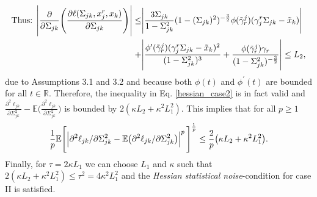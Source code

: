\begin{condition}
\begin{multline}
\begin{aligned}
            \end{aligned}
    \end{multline} 
    \begin{equation*}
        \begin{split}
            \text{Thus: } \abs{\frac{\partial}{\partial \Sigma_{jk}} \Bigg(\frac{\partial\ell(\Sigma_{jk}, x_j^r,x_k)}{\partial \Sigma_{jk}}\Bigg)} \leq &\abs{\frac{3\Sigma_{jk}}{1-\Sigma_{jk}^2} (1-(\Sigma_{jk})^2)^{-\frac{3}{2}} \phi({\tilde{\gamma}}^j_{r})({\gamma}_j^r\Sigma_{jk} - {\tilde{x}}_{k})} \\
            + &\abs{\frac{\phi^\prime({\tilde{\gamma}}^j_{r})({\gamma}_j^r\Sigma_{jk} - {\tilde{x}}_{k})^2}{(1-\Sigma_{jk}^2)^3} + \frac{\phi({\tilde{\gamma}}^j_{r}){\gamma}_{r}}{(1-\Sigma_{jk}^2)^{-\frac{3}{2}}}} \leq L_2,
        \end{split} 
    \end{equation*}
    due to Assumptions 3.1 and 3.2 %
    and because both $\phi(t)$ and $\phi^{\prime}(t)$ are bounded for all $t\in\mathbb{R}$. Therefore, the inequality in Eq. \eqref{hessian_case2} is in fact valid and $\frac{\partial^2\ell_{jk}}{\partial \Sigma_{jk}^{2}} - \mathbb{E}\bigg(\frac{\partial^2\ell_{jk}}{\partial \Sigma_{jk}^{2}}\bigg)$ is bounded by $2(\kappa L_2 + \kappa^2 L_1^2)$. This implies that for all $p\geq1$
    \begin{equation}
         \frac{1}{p}\mathbb{E}\Bigg[\abs{\partial^2\ell_{jk}/\partial \Sigma_{jk}^{2} - \mathbb{E}\big(\partial^2\ell_{jk}/\partial \Sigma_{jk}^{2}\big)}^p\Bigg]^{\frac{1}{p}} \leq \frac{2}{p}\big(\kappa L_2 + \kappa^2 L_1^2\big).
    \end{equation}
    Finally, for $\tau = 2\kappa L_1$ we can choose $L_1$ and $\kappa$ such that $2(\kappa L_2 + \kappa^2 L_1^2) \leq \tau^2 = 4\kappa^2 L_1^2$ and the \textit{Hessian statistical noise}-condition for case II is satisfied. 
    

\end{condition}
